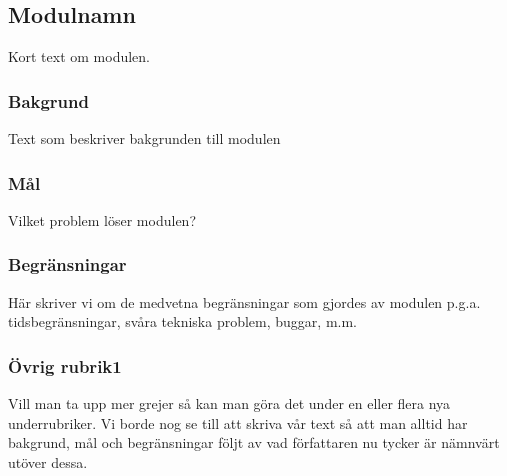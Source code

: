 \subsection{Modulnamn}
Kort text om modulen.

\subsubsection{Bakgrund}
Text som beskriver bakgrunden till modulen

\subsubsection{Mål}
Vilket problem löser modulen?

\subsubsection{Begränsningar}
Här skriver vi om de medvetna begränsningar som gjordes av modulen
p.g.a. tidsbegränsningar, svåra tekniska problem, buggar, m.m.

\subsubsection{Övrig rubrik1}
Vill man ta upp mer grejer så kan man göra det under en eller flera nya
underrubriker. Vi borde nog se till att skriva vår text så att man
alltid har bakgrund, mål och begränsningar följt av vad författaren nu
tycker är nämnvärt utöver dessa.

